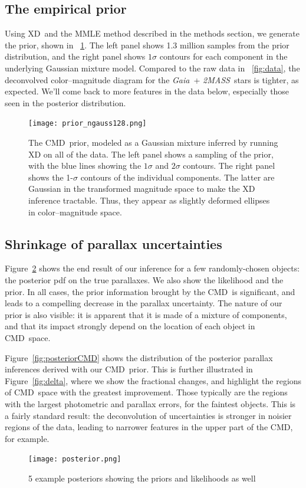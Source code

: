 \documentclass[modern]{aastex61}
\newcommand{\acronym}[1]{{\small{#1}}}
\newcommand{\project}[1]{\textsl{#1}}
\newcommand{\tmass}{\project{\acronym{2MASS}}}
\newcommand{\gaia}{\project{Gaia}}
\newcommand{\xd}{\acronym{XD}}
\newcommand{\cmd}{\acronym{CMD}}
\begin{document}
\subsection{The empirical prior}
Using \xd\ and the MMLE method described in the methods section, we generate the
prior, shown in \figurename~\ref{fig:prior}.
The left panel shows 1.3 million samples from the prior distribution, and the
right panel shows $1\sigma$ contours for each component in the underlying
Gaussian mixture model.
Compared to the raw data in \figurename~\ref{fig:data}, the deconvolved
color--magnitude diagram for the \gaia\ + \tmass\ stars is tighter, as expected.
We'll come back to more features in the data below, especially those seen in the posterior distribution.
\begin{figure}
\centering
  \texttt{[image: prior\_ngauss128.png]}
\caption{The \cmd\ prior, modeled as a Gaussian mixture inferred by
  running XD on all of the data. The left panel shows a sampling of
  the prior, with the blue lines showing the $1\sigma$ and $2\sigma$
  contours. The right panel shows the 1-$\sigma$ contours of the
  individual components. The latter are Gaussian in the transformed
  magnitude space to make the XD inference tractable. Thus, they
  appear as slightly deformed ellipses in color--magnitude space.}
\label{fig:prior}
\end{figure}

\subsection{Shrinkage of parallax uncertainties}

Figure~\ref{fig:posterior} shows the end result of our inference for a few randomly-chosen objects: the posterior pdf on the true parallaxes.
We also show the likelihood and the prior.
In all cases, the prior information brought by the \cmd\ is significant, and leads to a compelling decrease in the parallax uncertainty.
The nature of our prior is also visible: it is apparent that it is made of a mixture of components, and that its impact strongly depend on the location of each object in \cmd\ space.

Figure~\ref{fig:posteriorCMD} shows the distribution of the posterior parallax inferences derived with our \cmd\ prior.
This is further illustrated in Figure~\ref{fig:delta}, where we show the fractional changes, and highlight the regions of \cmd\ space with the greatest improvement.
Those typically are the regions with the largest photometric and parallax errors, for the faintest objects.
This is a fairly standard result: the deconvolution of uncertainties is stronger in noisier regions of the data, leading to narrower features in the upper part of the \cmd, for example.
\begin{figure}
\centering
  \texttt{[image: posterior.png]}
\caption{5 example posteriors showing the priors and likelihoods as well}
\label{fig:posterior}
\end{figure}
\end{document}
